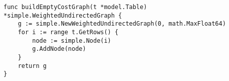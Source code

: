 \begin{lstlisting}[caption=Empty cost graph creation,label=lst:empty_cost_graph,float,floatplacement=H]
func buildEmptyCostGraph(t *model.Table) *simple.WeightedUndirectedGraph {
    g := simple.NewWeightedUndirectedGraph(0, math.MaxFloat64)
    for i := range t.GetRows() {
        node := simple.Node(i)
        g.AddNode(node)
    }
    return g
}
\end{lstlisting}